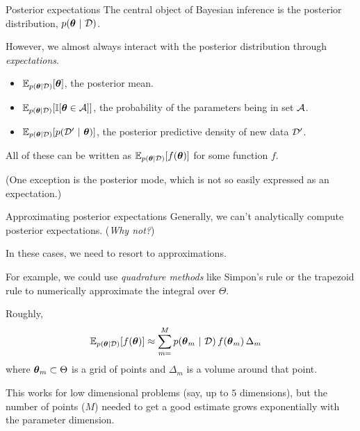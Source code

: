 \documentclass[aspectratio=169]{beamer}
\begin{document}
\begin{frame}{Posterior expectations}
The central object of Bayesian inference is the posterior distribution, $p(\boldsymbol{\theta} ~\vert~ \mathcal{D})$.

However, we almost always interact with the posterior distribution through \emph{expectations}.

\begin{itemize}
    \item $\mathbb{E}_{p(\boldsymbol{\theta} | \mathcal{D})}[\boldsymbol{\theta}]$, the posterior mean.
    \item $\mathbb{E}_{p(\boldsymbol{\theta} | \mathcal{D})}[\mathbb{I}[\boldsymbol{\theta} \in \mathcal{A}]]$, the probability of the parameters being in set $\mathcal{A}$.
    \item $\mathbb{E}_{p(\boldsymbol{\theta} | \mathcal{D})}[p(\mathcal{D}' ~\vert~ \boldsymbol{\theta})]$, the posterior predictive density of new data $\mathcal{D}'$.
\end{itemize}

All of these can be written as $\mathbb{E}_{p(\boldsymbol{\theta} | \mathcal{D})}[f(\boldsymbol{\theta})]$ for some function $f$.

(One exception is the posterior mode, which is not so easily expressed as an expectation.)
\end{frame}

\begin{frame}{Approximating posterior expectations}
Generally, we can't analytically compute posterior expectations. (\emph{Why not?})
    
In these cases, we need to resort to approximations.

For example, we could use \emph{quadrature methods} like Simpon's rule or the trapezoid rule to numerically approximate the integral over $\Theta$. 

Roughly,
\begin{align}
    \mathbb{E}_{p(\boldsymbol{\theta} | \mathcal{D})}[f(\boldsymbol{\theta})] &\approx \sum_{m=}^M p(\boldsymbol{\theta}_m ~\vert~ \mathcal{D}) \, f(\boldsymbol{\theta}_m) \, \Delta_m
\end{align}
where $\boldsymbol{\theta}_m \subset \Theta$ is a grid of points and $\Delta_m$ is a volume around that point.

This works for low dimensional problems (say, up to $5$ dimensions), but the number of points ($M$) needed to get a good estimate grows exponentially with the parameter dimension.

\end{frame}
\end{document}

